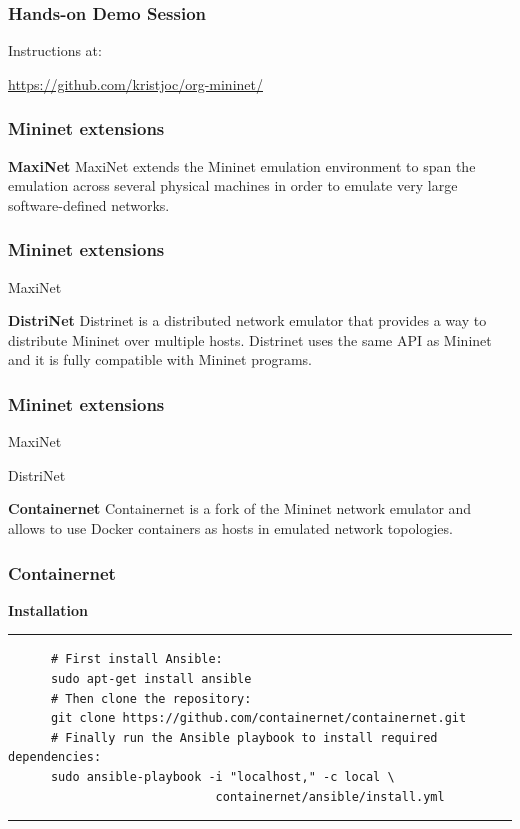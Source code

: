 \documentclass{beamer}
\begin{document}
\begin{frame}
  \frametitle{Hands-on Demo Session}
  \begin{block}{Instructions at:}

    \url{https://github.com/kristjoc/org-mininet/}
  \end{block}
\end{frame}

\begin{frame}
  \frametitle{Mininet extensions}

  \begin{block}{\textbf{MaxiNet}} 
    MaxiNet extends the Mininet emulation environment to span the
    emulation across several physical machines in order to emulate
    very large software-defined networks.
  \end{block}

\end{frame}
\begin{frame}
  \frametitle{Mininet extensions}

  \begin{block}{MaxiNet}
  \end{block}
  \begin{block}{\textbf{DistriNet}}
    Distrinet is a distributed network emulator that provides a way to
    distribute Mininet over multiple hosts. Distrinet uses the same
    API as Mininet and it is fully compatible with Mininet programs.
  \end{block}
\end{frame}
\begin{frame}
  \frametitle{Mininet extensions}

  \begin{block}{MaxiNet}
  \end{block}
  \begin{block}{DistriNet}
  \end{block}
  \begin{block}{\textbf{Containernet}} 
    Containernet is a fork of the Mininet network emulator and allows
    to use Docker containers as hosts in emulated network topologies.
  \end{block}
\end{frame}
\begin{frame}[fragile]
  \frametitle{Containernet}

    \begin{block}{\textbf{Installation}}
    \rule{\textwidth}{0.5pt}
    \small
    \begin{verbatim}
      # First install Ansible:
      sudo apt-get install ansible
      # Then clone the repository:
      git clone https://github.com/containernet/containernet.git
      # Finally run the Ansible playbook to install required dependencies:
      sudo ansible-playbook -i "localhost," -c local \
                             containernet/ansible/install.yml
  \end{verbatim}
  \rule{\textwidth}{0.5pt}
\end{block}
\end{frame}
\end{document}
